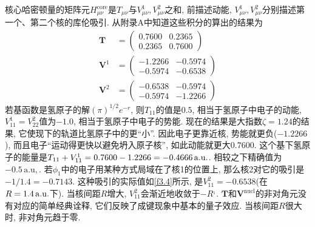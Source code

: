 核心哈密顿量的矩阵元$H_{\mu\nu}^\mathrm{core}$是$T_{\mu\nu}$与$V_{\mu\nu}^1,V_{\mu\nu}^2$之和, 前描述动能, $V_{\mu\nu}^1,V_{\mu\nu}^2$分别描述第一个、第二个核的库伦吸引. 从附录A中知道这些积分的算出的结果为
\begin{align}
\mathbf{T} & = 
\begin{pmatrix}
0.7600&0.2365\\0.2365&0.7600
\end{pmatrix}\\
\mathbf{V}^1 & = 
\begin{pmatrix}
-1.2266&-0.5974\\-0.5974&-0.6538
\end{pmatrix}\\
\mathbf{V}^2 & = 
\begin{pmatrix}
-0.6538&-0.5974\\-0.5974&-1.2266
\end{pmatrix}
\end{align}
若基函数是氢原子的解$(\pi)^{1/2}e^{-r}$, 则$T_{11}$的值是$0.5$, 相当于氢原子中电子的动能, $V_{11}^1=V_{22}^2$值为$-1.0$, 相当于氢原子中电子的势能. 现在的结果是大指数$\zeta=1.24$的结果, 它使现下的轨道比氢原子中的更``小”. 因此电子更靠近核, 势能就更负($-1.2266$), 而且电子``运动得更快以避免坍入原子核”, 如此动能就更大$0.7600$. 这个基下氢原子的能量是$T_{11}+V_{11}^1=0.7600-1.2266=-0.4666\,\mathrm{a.u.}$. 相较之下精确值为$-0.5\,\mathrm{a.u,}$. 若$\phi_1$中的电子用某种方式局域在了核1的位置上, 那么核2对它的吸引是$-1/1.4=-0.7143$. 这种吸引的实际值如\ref{f3.4}所示, 是$V_{11}^2=-0.6538$(在$R=1.4\,\mathrm{a.u.}$下). 当核间距$R$增大, $V_{11}^2$会渐近地收敛于$-R^{_1}$. $\mathbf{T}$和$\mathbf{V}^\mathrm{nucl}$的非对角元没有对应的简单经典诠释, 它们反映了成键现象中基本的量子效应. 当核间距$R$很大时, 非对角元趋于零.

